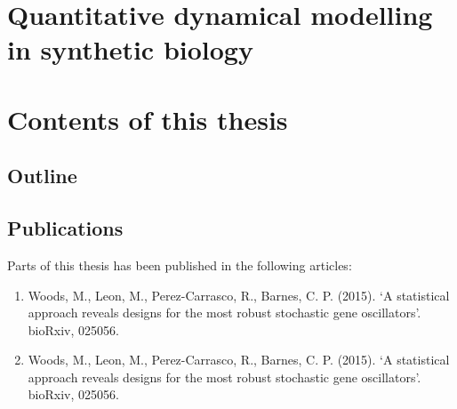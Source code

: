 
\section{Quantitative dynamical modelling in synthetic biology}

\section{Contents of this thesis}

\subsection{Outline}

\subsection{Publications}

Parts of this thesis has been published in the following articles:

\begin{enumerate}
	\item Woods, M., Leon, M., Perez-Carrasco, R.,  Barnes, C. P. (2015). ‘A statistical
approach reveals designs for the most robust stochastic gene oscillators’. bioRxiv, 025056.
	
	\item Woods, M., Leon, M., Perez-Carrasco, R.,  Barnes, C. P. (2015). ‘A statistical
approach reveals designs for the most robust stochastic gene oscillators’. bioRxiv, 025056.
	
\end{enumerate}